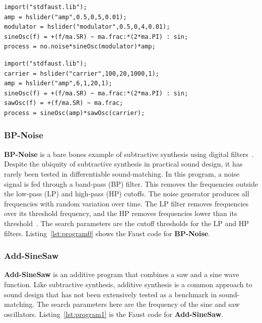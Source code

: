 \documentclass[lettersize,journal]{IEEEtran}
\newcommand{\BPNoise}{\textbf{BP-Noise}}
\newcommand{\AddSineSaw}{\textbf{Add-SineSaw}}
\newcommand{\AmpMod}{\textbf{Noise-AM}}
\newcommand{\FMMod}{\textbf{SineSaw-AM}}
\begin{document}
\begin{lstlisting}[caption={\AmpMod}, label={lst:program2},language=Faust,float,floatplacement=!H,xleftmargin=1em,xrightmargin=0.5em,firstnumber=0,aboveskip=0em, belowskip=-1em]
import("stdfaust.lib");
amp = hslider("amp",0.5,0,5,0.01);
modulator = hslider("modulator",0.5,0,4,0.01);
sineOsc(f) = +(f/ma.SR) ~ ma.frac:*(2*ma.PI) : sin;
process = no.noise*sineOsc(modulator)*amp;
\end{lstlisting}

\begin{lstlisting}[caption={\FMMod}, label={lst:program3},language=Faust,float,floatplacement=!H,xleftmargin=1em,xrightmargin=0.5em,firstnumber=0,aboveskip=0em, belowskip=-1em]
import("stdfaust.lib");
carrier = hslider("carrier",100,20,1000,1);
amp = hslider("amp",6,1,20,1);
sineOsc(f) = +(f/ma.SR) ~ ma.frac:*(2*ma.PI) : sin;
sawOsc(f) = +(f/ma.SR) ~ ma.frac;
process = sineOsc(amp)*sawOsc(carrier);
\end{lstlisting}

\subsubsection{\BPNoise}
\label{sec:program0}
\BPNoise{} is a bare bones example of subtractive synthesis using digital filters~\cite{smith2007introduction}. Despite the ubiquity of subtractive synthesis in practical sound design, it has rarely been tested in differentiable sound-matching. In this program, a noise signal is fed through a band-pass (BP) filter. This removes the frequencies outside the low-pass (LP) and high-pass (HP) cutoffs. The noise generator produces all frequencies with random variation over time. The LP filter removes frequencies over its threshold frequency, and the HP removes frequencies lower than its threshold~\cite{smith2007introduction}. The search parameters are the cutoff thresholds for the LP and HP filters. Listing~\ref{lst:program0} shows the Faust code for \BPNoise.

\subsubsection{\AddSineSaw}
\label{sec:program1}
\AddSineSaw{} is an additive program that combines a saw and a sine wave function. Like subtractive synthesis, additive synthesis is a common approach to sound design that has not been extensively tested as a benchmark in sound-matching. The search parameters here are the frequency of the sine and saw oscillators. Listing~\ref{lst:program1} is the Faust code for \AddSineSaw.
\end{document}
